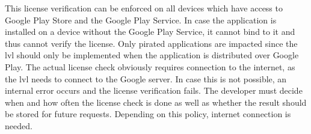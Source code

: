 This license verification can be enforced on all devices which have access to Google Play Store and the Google Play Service.
In case the application is installed on a device without the Google Play Service, it cannot bind to it and thus cannot verify the license.
Only pirated applications are impacted since the \gls{lvl} should only be implemented when the application is distributed over Google Play.
The actual license check obviously requires connection to the internet, as the \gls{lvl} needs to connect to the Google server.
In case this is not possible, an internal error occurs and the license verification fails.
The developer must decide when and how often the license check is done as well as whether the result should be stored for future requests.
Depending on this policy, internet connection is needed. \cite{developersLicensingOverview} \cite{developersLicensingSetup} \cite{developersLicensingAdding} \cite{digipomLvl}
